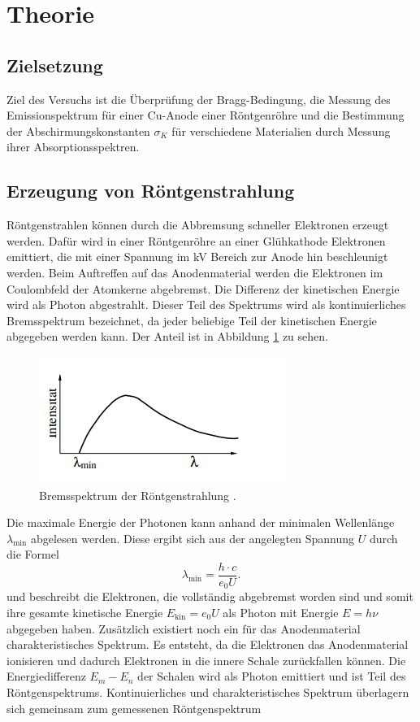 \section{Theorie}
\label{sec:Theorie}
\subsection{Zielsetzung}
Ziel des Versuchs ist die Überprüfung der Bragg-Bedingung, die Messung des Emissionspektrum für einer Cu-Anode
einer Röntgenröhre und die Bestimmung der Abschirmungskonstanten $\sigma_K$ für verschiedene Materialien durch Messung ihrer Absorptionsspektren.
\subsection{Erzeugung von Röntgenstrahlung}
Röntgenstrahlen können durch die Abbremsung schneller Elektronen erzeugt werden. Dafür wird in einer Röntgenröhre an einer
Glühkathode Elektronen emittiert, die mit einer Spannung im kV Bereich zur Anode hin beschleunigt werden. Beim Auftreffen auf das Anodenmaterial werden 
die Elektronen im Coulombfeld der Atomkerne abgebremst. Die Differenz der kinetischen Energie wird als Photon abgestrahlt. Dieser Teil des Spektrums wird als kontinuierliches 
Bremsspektrum bezeichnet, da jeder beliebige Teil der kinetischen Energie abgegeben werden kann. Der Anteil ist in Abbildung \ref{fig:Brems} zu sehen.
\begin{figure}[H]
    \centering
    \includegraphics[scale=1.5]{content/Bremsspektrum.png}
    \caption{Bremsspektrum der Röntgenstrahlung \cite{sample}.}
    \label{fig:Brems}
\end{figure}
\noindent Die maximale Energie der Photonen kann anhand der minimalen Wellenlänge $\lambda_\text{min}$ abgelesen werden. Diese ergibt sich aus der angelegten Spannung $U$
durch die Formel
\begin{equation}
    \lambda_\text{min}=\frac{h\cdot c}{e_0U}.
    \label{eq:minWelle}
\end{equation}
und beschreibt die Elektronen, die vollständig abgebremst worden sind und somit ihre gesamte kinetische Energie $E_\text{kin}=e_0U$ als Photon mit Energie $E=h\nu$ abgegeben haben.
Zusätzlich existiert noch ein für das Anodenmaterial charakteristisches Spektrum. Es entsteht, da die Elektronen das Anodenmaterial ionisieren und dadurch
Elektronen in die innere Schale zurückfallen können. Die Energiedifferenz $E_m-E_n$ der Schalen wird als Photon emittiert und ist Teil des Röntgenspektrums.
Kontinuierliches und charakteristisches Spektrum überlagern sich gemeinsam zum gemessenen Röntgenspektrum
